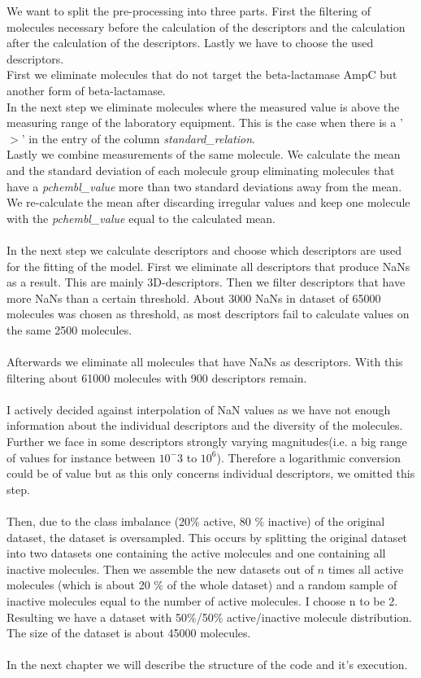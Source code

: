 \documentclass[12pt]{article}
\begin{document}
We want to split the pre-processing into three parts. First the filtering of molecules necessary before the calculation of the descriptors and the calculation after the calculation of the descriptors. Lastly we have to choose the used descriptors.\\
First we eliminate molecules that do not target the beta-lactamase AmpC but another form of beta-lactamase.\\
%
In the next step we eliminate molecules where the measured value is above the measuring range of the laboratory equipment. This is the case when there is a '$>$' in the entry of the column \textit{standard\_relation}.\\
%
Lastly we combine measurements of the same molecule. We calculate the mean and the standard deviation of each molecule group eliminating molecules that have a \textit{pchembl\_value} more than two standard deviations away from the mean. We re-calculate the mean after discarding irregular values and keep one molecule with the \textit{pchembl\_value} equal to the calculated mean.\\\\
%
In the next step we calculate descriptors and choose which descriptors are used for the fitting of the model. First we eliminate all descriptors that produce NaNs as a result. This are mainly 3D-descriptors. Then we filter descriptors that have more NaNs than a certain threshold. About 3000 NaNs in dataset of 65000 molecules was chosen as threshold, as most descriptors fail to calculate values on the same 2500 molecules.\\\\
%
Afterwards we eliminate all molecules that have NaNs as descriptors. With this filtering about 61000 molecules with 900 descriptors remain.\\\\
%
I actively decided against interpolation of NaN values as we have not enough information about the individual descriptors and the diversity of the molecules. Further we face in some descriptors strongly varying magnitudes(i.e. a big range of values for instance between $10^-3$ to $10^6$). Therefore a logarithmic conversion could be of value but as this only concerns individual descriptors, we omitted this step.\\\\ 
%
Then, due to the class imbalance (20\% active, 80 \% inactive) of the original dataset, the dataset is oversampled. This occurs by splitting the original dataset into two datasets one containing  the active molecules and one containing all inactive molecules. Then we assemble the new datasets out of $n$ times all active molecules (which is about 20 \% of the whole dataset) and a random sample of inactive molecules equal to the number of active molecules. I choose n to be 2. Resulting we have a dataset with 50\%/50\% active/inactive molecule distribution. The size of the dataset is about 45000 molecules.\\\\
In the next chapter we will describe the structure of the code and it's execution.
%
%
\end{document}
